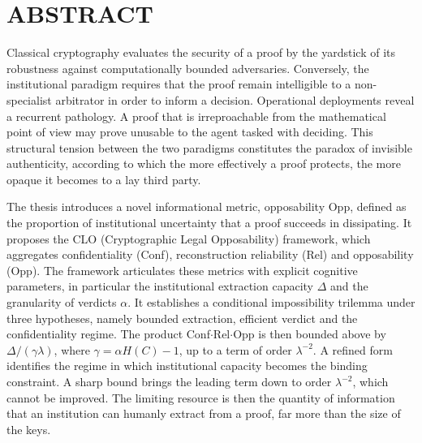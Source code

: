
\chapter*{ABSTRACT}
\thispagestyle{preliminaire}

\begin{sloppypar}

Classical cryptography evaluates the security of a proof by the yardstick
of its robustness against computationally bounded adversaries. Conversely,
the institutional paradigm requires that the proof remain intelligible to
a non-specialist arbitrator in order to inform a decision. Operational
deployments reveal a recurrent pathology. A proof that is irreproachable
from the mathematical point of view may prove unusable to the agent tasked
with deciding. This structural tension between the two paradigms
constitutes the paradox of invisible authenticity, according to which the
more effectively a proof protects, the more opaque it becomes to a lay
third party.

The thesis introduces a novel informational metric, opposability Opp,
defined as the proportion of institutional uncertainty that a proof
succeeds in dissipating. It proposes the CLO (Cryptographic Legal Opposability) framework, which aggregates
confidentiality (Conf), reconstruction reliability (Rel) and opposability (Opp).
The framework articulates these metrics with explicit cognitive parameters, in particular the
institutional extraction capacity $\Delta$ and the granularity of verdicts
$\alpha$. It establishes a conditional impossibility trilemma under three
hypotheses, namely bounded extraction, efficient verdict and the confidentiality
regime. The product Conf$\cdot$Rel$\cdot$Opp is then bounded above by
$\Delta/(\gamma\lambda)$, where $\gamma = \alpha H(C) - 1$, up to a term of order
$\lambda^{-2}$. A refined form identifies the regime in
which institutional capacity becomes the binding constraint. A sharp bound brings
the leading term down to order $\lambda^{-2}$, which cannot be improved. The limiting resource is then the quantity
of information that an institution can humanly extract from a proof, far
more than the size of the keys.


\end{sloppypar}
